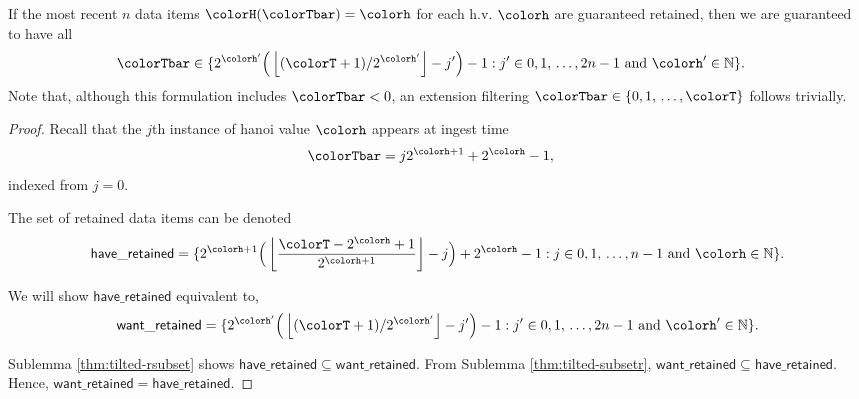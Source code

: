 \begin{lemma}
\label{thm:retained-equivalence-tilted}
If the most recent $n$ data items $\colorH(\colorTbar) = \colorh$ for each h.v. $\colorh$ are guaranteed retained, then we are guaranteed to have all
\begin{align*}
\colorTbar
&\in
\{
  2^{\colorh'}\Big(\left\lfloor (\colorT + 1) / 2^{\colorh'} \right\rfloor - j'\Big) - 1
  :
  j' \in 0,1,\,\ldots,2n-1
  \text{ and }
  \colorh' \in \mathbb{N}
\}.
\end{align*}
Note that, although this formulation includes $\colorTbar < 0$, an extension filtering $\colorTbar \in \{0,1,\,\ldots,\colorT\}$ follows trivially.
\end{lemma}
\begin{proof}

Recall that the $j$th instance of hanoi value $\colorh$ appears at ingest time
\begin{align*}
\colorTbar
&= j2^{\colorh + 1} + 2^{\colorh} - 1,
\end{align*}
indexed from $j=0$.

The set of retained data items can be denoted
\begin{align*}
\mathsf{have\_retained} =
\{
  2^{\colorh + 1}\Big( \left\lfloor\frac{\colorT - 2^{\colorh} + 1}{2^{\colorh + 1}} \right\rfloor - j\Big) + 2^{\colorh} - 1
  :
  j \in 0,1,\,\ldots,n-1
  \text{ and }
  \colorh \in \mathbb{N}
\}.
\end{align*}

We will show $\mathsf{have\_retained}$ equivalent to,
\begin{align*}
\mathsf{want\_retained} =
\{
  2^{\colorh'}\Big(\left\lfloor (\colorT + 1)/ 2^{\colorh'} \right\rfloor - j'\Big) - 1
  :
  j' \in 0,1,\,\ldots,2n-1
  \text{ and }
  \colorh' \in \mathbb{N}
\}.
\end{align*}

Sublemma \ref{thm:tilted-rsubset} shows $\mathsf{have\_retained} \subseteq \mathsf{want\_retained}$.
From Sublemma \ref{thm:tilted-subsetr}, $\mathsf{want\_retained} \subseteq \mathsf{have\_retained}$.
Hence, $\mathsf{want\_retained} = \mathsf{have\_retained}$.

\end{proof}

